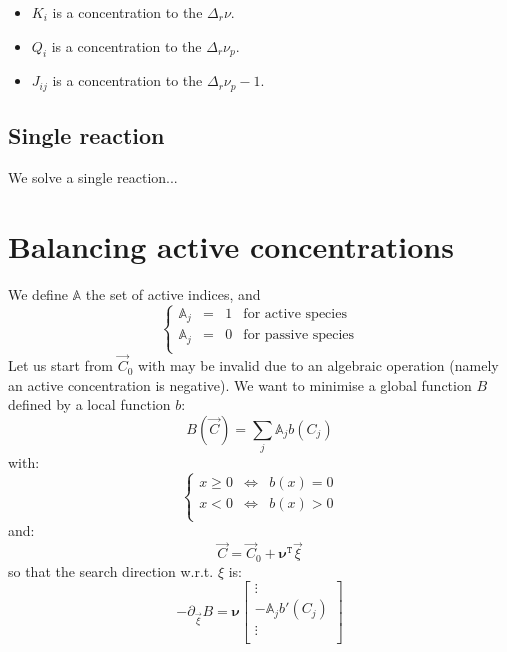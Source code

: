 \documentclass[aps,12pt]{revtex4}
\newcommand{\trn}[1]{{#1}^{\mathtt{T}}}
\begin{document}
\begin{itemize}
\item $K_i$ is a concentration to the $\Delta_r \nu$.
\item $Q_i$ is a concentration to the $\Delta_r \nu_p$.
\item $J_{ij}$ is a concentration to the $\Delta_r \nu_p-1$.
\end{itemize}

\subsection{Single reaction}
We solve a single reaction...

\section{Balancing active concentrations}
We define $\mathbb{A}$ the set of active indices, and 
\begin{equation}
\left\lbrace
\begin{array}{rccl}
\mathbb{A}_j & = & 1  & \text{for active species}\\
\mathbb{A}_j & = & 0  & \text{for passive species}\\
\end{array}
\right.
\end{equation}
Let us start from $\vec{C}_0$ with may be invalid due to an algebraic operation (namely an active concentration is negative).
We want to minimise a global function $B$ defined by a local function $b$:
\begin{equation}
	B(\vec{C}) = \sum_{j } \mathbb{A}_j b(C_j) 
\end{equation}
with:
\begin{equation}
\left\lbrace
\begin{array}{rcl}
	x\geq 0 & \Leftrightarrow & b(x) = 0\\
	x<0   & \Leftrightarrow & b(x) > 0\\
\end{array}
\right.
\end{equation}
and:
\begin{equation}
	\vec{C}=\vec{C}_0 + \trn{\bm{\nu}} \vec{\xi}
\end{equation}
so that the search direction w.r.t. $\xi$ is:
\begin{equation}
	-\partial_{\vec{\xi}} B = \bm{\nu}
	\begin{bmatrix}
		\vdots\\
		-\mathbb{A}_j b'(C_j)\\
		\vdots\\
	\end{bmatrix}
\end{equation}
\end{document}
